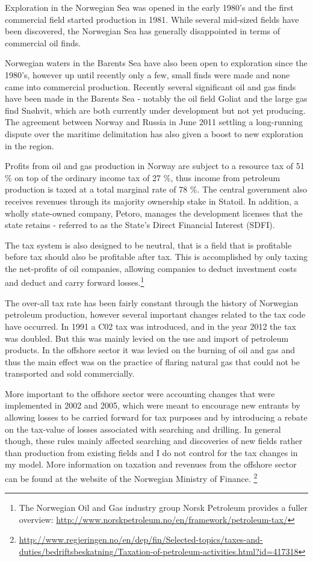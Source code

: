 \documentclass[12pt]{article}
\begin{document}
Exploration in the Norwegian Sea was opened in the early 1980’s and the first commercial field started production in 1981.  While several mid-sized fields have been discovered, the Norwegian Sea has generally disappointed in terms of commercial oil finds.  

Norwegian waters in the Barents Sea have also been open to exploration since the 1980's, however up until recently only a few, small finds were made and none came into commercial production.  Recently several significant oil and gas finds have been made in the Barents Sea - notably the oil field Goliat and the large gas find Sn\o hvit, which are both currently under development but not yet producing.  The agreement between Norway and Russia in June 2011 settling a long-running dispute over the maritime delimitation has also given a boost to new exploration in the region.  

Profits from oil and gas production in Norway are subject to a resource tax of 51 \% on top of the ordinary income tax of 27 \%, thus income from petroleum production is taxed at a total marginal rate of 78 \%.  The central government also receives revenues through its majority ownership stake in Statoil. In addition, a wholly state-owned company, Petoro, manages the development licenses that the state retains - referred to as the State's Direct Financial Interest (SDFI).

The tax system is also designed to be neutral, that is a field that is profitable before tax should also be profitable after tax. This is accomplished by only taxing the net-profits of oil companies, allowing companies to deduct investment costs and deduct and carry forward losses.\footnote{The Norwegian Oil and Gas industry group Norsk Petroleum provides a fuller overview: \url{http://www.norskpetroleum.no/en/framework/petroleum-tax/}}

The over-all tax rate has been fairly constant through the history of Norwegian petroleum production, however several important changes related to the tax code have occurred.  In 1991 a C02 tax was introduced, and in the year 2012 the tax was doubled.  But this was mainly levied on the use and import of petroleum products.  In the offshore sector it was levied on the burning of oil and gas and thus the main effect was on the practice of flaring natural gas that could not be transported and sold commercially.

More important to the offshore sector were accounting changes that were implemented in 2002 and 2005, which were meant to encourage new entrants by allowing losses to be carried forward for tax purposes and by introducing a rebate on the tax-value of losses associated with searching and drilling.  In general though, these rules mainly affected searching and discoveries of new fields rather than production from existing fields and I do not control for the tax changes in my model.  More information on taxation and revenues from the offshore sector can be found at the website of the Norwegian Ministry of Finance. \footnote{\url{http://www.regjeringen.no/en/dep/fin/Selected-topics/taxes-and-duties/bedriftsbeskatning/Taxation-of-petroleum-activities.html?id=417318}}
\end{document}
